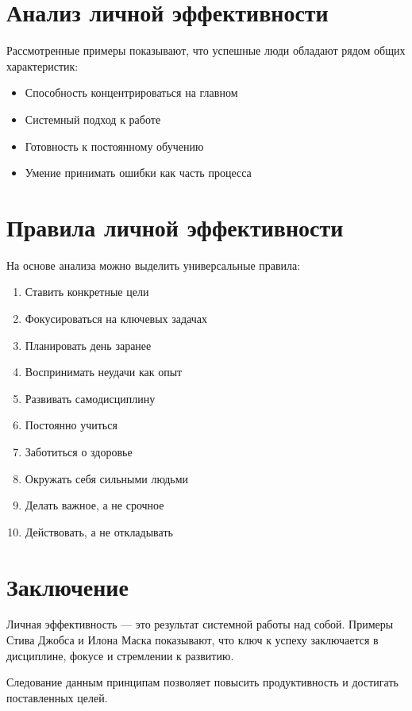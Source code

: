 \documentclass[12pt,a4paper]{article}
\begin{document}
\section{Анализ личной эффективности}

Рассмотренные примеры показывают, что успешные люди обладают рядом общих характеристик:

\begin{itemize}
    \item Способность концентрироваться на главном
    \item Системный подход к работе
    \item Готовность к постоянному обучению
    \item Умение принимать ошибки как часть процесса
\end{itemize}

\section{Правила личной эффективности}

На основе анализа можно выделить универсальные правила:

\begin{enumerate}
    \item Ставить конкретные цели
    \item Фокусироваться на ключевых задачах
    \item Планировать день заранее
    \item Воспринимать неудачи как опыт
    \item Развивать самодисциплину
    \item Постоянно учиться
    \item Заботиться о здоровье
    \item Окружать себя сильными людьми
    \item Делать важное, а не срочное
    \item Действовать, а не откладывать
\end{enumerate}

\section{Заключение}

Личная эффективность — это результат системной работы над собой. Примеры Стива Джобса и Илона Маска показывают, что ключ к успеху заключается в дисциплине, фокусе и стремлении к развитию.

Следование данным принципам позволяет повысить продуктивность и достигать поставленных целей.
\end{document}
